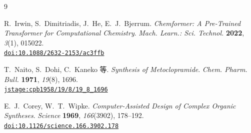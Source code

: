 \documentclass[a4paper, 12pt]{article}
\begin{document}
\renewcommand{\refname}{参考文献}
\begin{thebibliography}{9}

R.~Irwin, S.~Dimitriadis, J.~He, E.~J.~Bjerrum.
\textit{Chemformer: A Pre-Trained Transformer for Computational Chemistry}.
\textit{Mach. Learn.: Sci. Technol.} \textbf{2022}, \textit{3}(1), 015022.\\
\href{https://doi.org/10.1088/2632-2153/ac3ffb}{\texttt{doi:10.1088/2632-2153/ac3ffb}}

T.~Naito, S.~Dohi, C.~Kaneko 等.
\textit{Synthesis of Metoclopramide}.
\textit{Chem. Pharm. Bull.} \textbf{1971}, \textit{19}(8), 1696.\\
\href{https://www.jstage.jst.go.jp/article/cpb1958/19/8/19_8_1696/_article}{\texttt{jstage:cpb1958/19/8/19\_8\_1696}}

E.~J.~Corey, W.~T.~Wipke.
\textit{Computer-Assisted Design of Complex Organic Syntheses}.
\textit{Science} \textbf{1969}, \textit{166}(3902), 178--192.\\
\href{https://doi.org/10.1126/science.166.3902.178}{\texttt{doi:10.1126/science.166.3902.178}}

\end{thebibliography}
\end{document}
